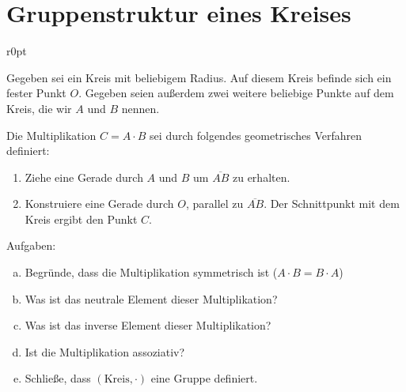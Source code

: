 \documentclass[a4paper,german,12pt,smallheadings]{scrartcl}
\begin{document}
\section*{Gruppenstruktur eines Kreises}
\begin{wrapfigure}{r}{0pt}
\end{wrapfigure}

Gegeben sei ein Kreis mit beliebigem Radius. Auf diesem Kreis befinde sich ein
fester Punkt $O$. Gegeben seien außerdem zwei weitere beliebige Punkte auf dem
Kreis, die wir $A$ und $B$ nennen.

\noindent Die Multiplikation $C = A \cdot B$ sei durch folgendes geometrisches Verfahren
definiert:

\begin{enumerate}
  \item Ziehe eine Gerade durch $A$ und $B$ um $\overline{AB}$ zu erhalten.
  \item Konstruiere eine Gerade durch $O$, parallel zu $\overline{AB}$. Der
    Schnittpunkt mit dem Kreis ergibt den Punkt $C$.
\end{enumerate}

\noindent Aufgaben:

\begin{enumerate}[a)]
  \item Begründe, dass die Multiplikation symmetrisch ist ($A \cdot B = B \cdot A$)
  \item Was ist das neutrale Element dieser Multiplikation?
  \item Was ist das inverse Element dieser Multiplikation?
  \item Ist die Multiplikation assoziativ?
  \item Schließe, dass $(\text{Kreis}, \cdot)$ eine Gruppe definiert.
\end{enumerate}

\end{document}
